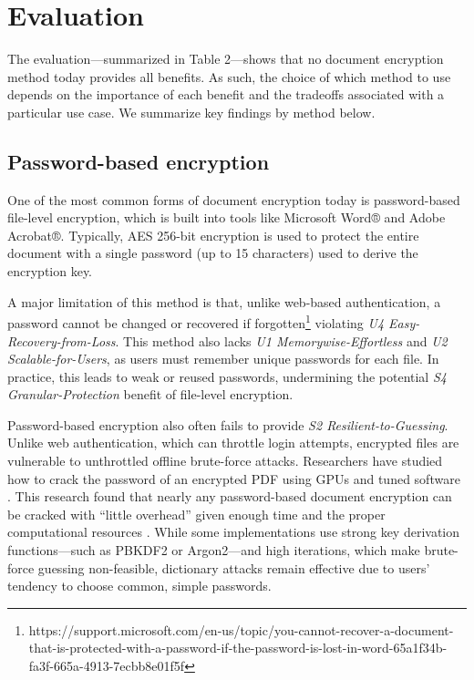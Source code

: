 \documentclass[sigconf]{acmart}
\begin{document}


\section{Evaluation}
The evaluation—summarized in Table 2—shows that no
document encryption method today provides all benefits. As such, the choice of which method to use depends on the importance of each benefit and the tradeoffs associated with a particular use case. We summarize key findings by method below.

\subsection{Password-based encryption}
One of the most common forms of document encryption today is password-based file-level encryption, which is built into tools like Microsoft Word® and Adobe Acrobat®. Typically, AES 256-bit encryption is used to protect the entire document with a single password (up to 15 characters) used to derive the encryption key.

A major limitation of this method is that, unlike web-based authentication, a password cannot be changed or recovered if forgotten\footnote{https://support.microsoft.com/en-us/topic/you-cannot-recover-a-document-that-is-protected-with-a-password-if-the-password-is-lost-in-word-65a1f34b-fa3f-665a-4913-7ecbb8e01f5f} violating \textit{U4 Easy-Recovery-from-Loss}. This method also lacks \textit{U1 Memorywise-Effortless} and \textit{U2 Scalable-for-Users}, as users must remember unique passwords for each file. In practice, this leads to weak or reused passwords, undermining the potential \textit{S4 Granular-Protection} benefit of file-level encryption.

Password-based encryption also often fails to provide \textit{S2 Resilient-to-Guessing}. Unlike web authentication, which can throttle login attempts, encrypted files are vulnerable to unthrottled offline brute-force attacks. Researchers have studied how to crack the password of an encrypted PDF using GPUs \cite{danczul_cuteforce_2013} and tuned software \cite{hranicky_experimental_2024}. This research found that nearly any password-based document encryption can be cracked with “little overhead” given enough time and the proper computational resources \cite{danczul_cuteforce_2013}. While some implementations use strong key derivation functions—such as PBKDF2 or Argon2—and high iterations, which make brute-force guessing non-feasible,
dictionary attacks remain effective due to users’ tendency to choose common, simple passwords.
\end{document}
